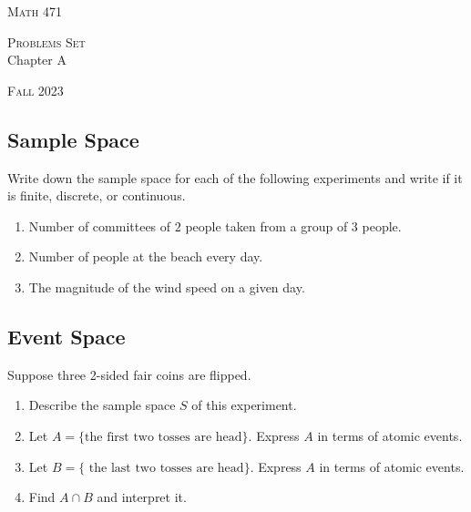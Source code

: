 


\hrulefill

\begin{minipage}{0.33\textwidth}
\textsc{Math 471}
\end{minipage} \hfill 
\begin{minipage}{0.32\textwidth}
\centering
\textsc{Problems Set} \\
Chapter A
\end{minipage}
 \hfill 
 \begin{minipage}{0.33\textwidth}
 \flushright \textsc{Fall 2023}
 \end{minipage}

\hrulefill

\setcounter{section}{1}

 \subsection{Sample Space}

	\begin{problem}
	Write down the sample space for each of the following experiments and write if it is finite, discrete, or continuous.
		\begin{enumerate}[label=\alph*)]
		\item Number of committees of $2$ people taken from a group of $3$ people.
		\item Number of people at the beach every day.
		\item The magnitude of the wind speed on a given day.
		\end{enumerate}
	\end{problem}
	
	\subsection{Event Space}
	
	\begin{problem}
	Suppose three 2-sided fair coins are flipped. 
		\begin{enumerate}[label=\alph*)]
		\item Describe the sample space $S$ of this experiment.
		\item Let $A = \{ \text{the first two tosses are head} \}$. Express $A$ in terms of atomic events.
		\item Let $B = \{ \text{ the last two tosses are head} \}$. Express $A$ in terms of atomic events.
		\item Find $A \cap B$ and interpret it.
		\end{enumerate}
	\end{problem}
	
